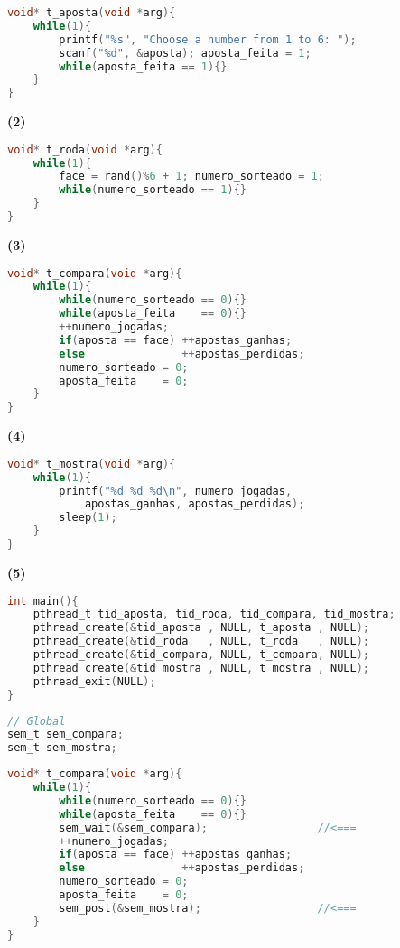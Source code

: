\documentclass{sope}
\begin{document}
\begin{lstlisting}[language=C]
void* t_aposta(void *arg){
    while(1){
        printf("%s", "Choose a number from 1 to 6: ");
        scanf("%d", &aposta); aposta_feita = 1;
        while(aposta_feita == 1){}
    }
}
\end{lstlisting}
\textbf{(2)}
\begin{lstlisting}[language=C]
void* t_roda(void *arg){
    while(1){
        face = rand()%6 + 1; numero_sorteado = 1;
        while(numero_sorteado == 1){}
    }
}
\end{lstlisting}
\textbf{(3)}
\begin{lstlisting}[language=C]
void* t_compara(void *arg){
    while(1){
        while(numero_sorteado == 0){}
        while(aposta_feita    == 0){}
        ++numero_jogadas;
        if(aposta == face) ++apostas_ganhas;
        else               ++apostas_perdidas;
        numero_sorteado = 0;
        aposta_feita    = 0;
    }
}
\end{lstlisting}
\textbf{(4)}
\begin{lstlisting}[language=C]
void* t_mostra(void *arg){
    while(1){
        printf("%d %d %d\n", numero_jogadas,
            apostas_ganhas, apostas_perdidas);
        sleep(1);
    }
}
\end{lstlisting}
\textbf{(5)}
\begin{lstlisting}[language=C]
int main(){
    pthread_t tid_aposta, tid_roda, tid_compara, tid_mostra;
    pthread_create(&tid_aposta , NULL, t_aposta , NULL);
    pthread_create(&tid_roda   , NULL, t_roda   , NULL);
    pthread_create(&tid_compara, NULL, t_compara, NULL);
    pthread_create(&tid_mostra , NULL, t_mostra , NULL);
    pthread_exit(NULL);
}
\end{lstlisting}

\begin{lstlisting}[language=C]
// Global
sem_t sem_compara;
sem_t sem_mostra;
\end{lstlisting}

\begin{lstlisting}[language=C]
void* t_compara(void *arg){
    while(1){
        while(numero_sorteado == 0){}
        while(aposta_feita    == 0){}
        sem_wait(&sem_compara);                 //<===
        ++numero_jogadas;
        if(aposta == face) ++apostas_ganhas;
        else               ++apostas_perdidas;
        numero_sorteado = 0;
        aposta_feita    = 0;
        sem_post(&sem_mostra);                  //<===
    }
}
\end{lstlisting}
\end{document}
